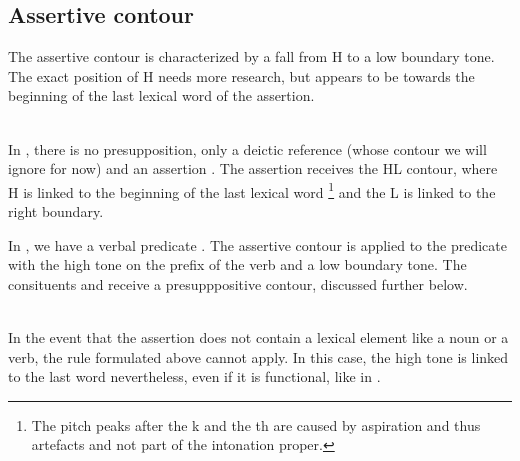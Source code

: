 \subsection{Assertive contour}\label{sec:phon:Assertivecontour}
The assertive contour is characterized by a fall from H to a low boundary tone. The exact position of H needs more research, but appears to be towards the beginning of the last lexical word of the assertion.

 \\
In , there is no presupposition, only a deictic reference (whose contour we will ignore for now) and an assertion . The  assertion receives the HL contour, where H is linked to the beginning of the last lexical word \footnote{The pitch peaks after the k and the th are caused by aspiration and thus artefacts and not part of the intonation proper.} and the L is linked to the right boundary.

In , we have a verbal predicate . The assertive contour is applied to the predicate with the high tone on the prefix of the verb and a low boundary tone. The consituents  and  receive a presupppositive contour, discussed further below.

 \\
In the event that the assertion does not contain a lexical element like a noun or a verb, the rule formulated above cannot apply. In this case,  the high tone is linked to the last word nevertheless, even if it is functional, like  in .

